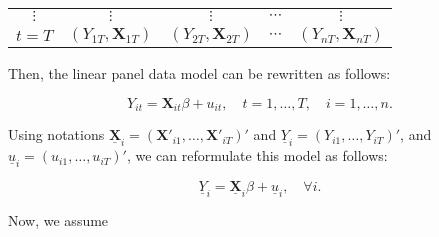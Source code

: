 \documentclass[
  12pt,
]{article}
\begin{document}
\begin{longtable}[]{@{}ccccc@{}}
\begin{minipage}[t]{0.17\columnwidth}\centering
\(\vdots\)\strut
\end{minipage} & \begin{minipage}[t]{0.17\columnwidth}\centering
\(\vdots\)\strut
\end{minipage} & \begin{minipage}[t]{0.17\columnwidth}\centering
\(\vdots\)\strut
\end{minipage} & \begin{minipage}[t]{0.17\columnwidth}\centering
\(\cdots\)\strut
\end{minipage} & \begin{minipage}[t]{0.17\columnwidth}\centering
\(\vdots\)\strut
\end{minipage}\tabularnewline
\begin{minipage}[t]{0.17\columnwidth}\centering
\(t = T\)\strut
\end{minipage} & \begin{minipage}[t]{0.17\columnwidth}\centering
\((Y_{1T}, \mathbf{X}_{1T})\)\strut
\end{minipage} & \begin{minipage}[t]{0.17\columnwidth}\centering
\((Y_{2T}, \mathbf{X}_{2T})\)\strut
\end{minipage} & \begin{minipage}[t]{0.17\columnwidth}\centering
\(\cdots\)\strut
\end{minipage} & \begin{minipage}[t]{0.17\columnwidth}\centering
\((Y_{nT}, \mathbf{X}_{nT})\)\strut
\end{minipage}\tabularnewline
\bottomrule
\end{longtable}

Then, the linear panel data model can be rewritten as follows:

\[
  Y_{it} = \mathbf{X}_{it} \beta + u_{it}, \quad t = 1, \ldots, T, \quad i = 1, \ldots, n.
\]

Using notations
\(\underline{\mathbf{X}}_i = (\mathbf{X}'_{i1}, \ldots, \mathbf{X}'_{iT})'\)
and \(\underline{Y}_i = (Y_{i1}, \ldots, Y_{iT})'\), and
\(\underline{u}_i = (u_{i1}, \ldots, u_{iT})'\), we can reformulate this
model as follows:

\[
  \underline{Y}_i = \underline{\mathbf{X}}_i \beta + \underline{u}_i, \quad \forall i.
\]

Now, we assume
\end{document}
